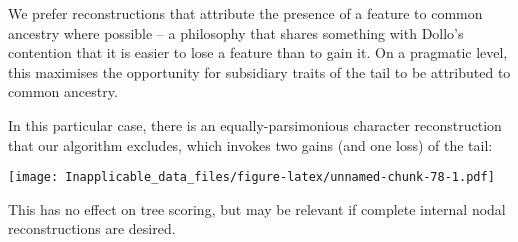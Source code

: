 \documentclass[]{book}
\theoremstyle{definition}
\theoremstyle{definition}
\theoremstyle{definition}
\theoremstyle{remark}
\begin{document}
We prefer reconstructions that attribute the presence of a feature to
common ancestry where possible -- a philosophy that shares something
with Dollo's contention that it is easier to lose a feature than to gain
it. On a pragmatic level, this maximises the opportunity for subsidiary
traits of the tail to be attributed to common ancestry.

In this particular case, there is an equally-parsimonious character
reconstruction that our algorithm excludes, which invokes two gains (and
one loss) of the tail:

\texttt{[image: Inapplicable\_data\_files/figure-latex/unnamed-chunk-78-1.pdf]}

This has no effect on tree scoring, but may be relevant if complete
internal nodal reconstructions are desired.


\end{document}
